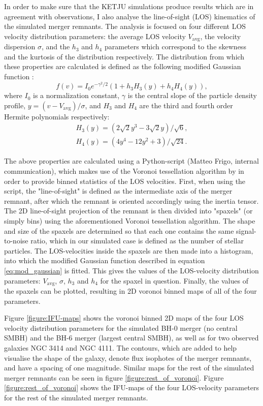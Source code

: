 \documentclass[english, oneside]{HYgradu}
\begin{document}
In order to make sure that the KETJU simulations produce results which are in agreement with observations, I  also analyse the line-of-sight (LOS) kinematics of the simulated merger remnants. The analysis is focused on four different LOS velocity distribution parameters: the average LOS velocity $V_\mathrm{avg}$, the velocity dispersion $\sigma$, and the $h_3$ and $h_4$ parameters which correspond to the skewness and the kurtosis of the distribution respectively. The distribution from which these properties are calculated is defined as the following modified Gaussian function \citep{VanDerMarel1993, Bender1994}:
\begin{equation}
f(v) = I_0 e^{-\gamma^2/2}(1 + h_3 H_3(y) + h_4 H_4(y)), \label{eq:mod_gaussian}
\end{equation} 
where $I_0$ is a normalization constant, $\gamma$ is the central slope of the particle density profile, $y = (v - V_\mathrm{avg})/\sigma$, and $H_3$ and $H_4$ are the third and fourth order Hermite polynomials respectively:
\begin{eqnarray}
H_3(y) = \left(2\sqrt{2}y^3 - 3\sqrt{2}y\right) / \sqrt{6}, \\
H_4(y) = \left(4y^4 - 12y^2 + 3 \right) / \sqrt{24}.
\end{eqnarray}

The above properties are calculated using a Python-script (Matteo Frigo, internal communication), which makes use of the Voronoi tessellation algorithm by \citep{Cappellari2003} in order to provide binned statistics of the LOS velocities. First, when using the script, the "line-of-sight" is defined as the intermediate axis of the merger remnant, after which the remnant is oriented accordingly using the inertia tensor. The 2D line-of-sight projection of the remnant is then divided into "spaxels" (or simply bins) using the aforementioned Voronoi tessellation algorithm. The shape and size of the spaxels are determined so that each one contains the same signal-to-noise ratio, which in our simulated case is defined as the number of stellar particles. The LOS-velocities inside the spaxels are then made into a histogram, into which the modified Gaussian function described in equation \ref{eq:mod_gaussian} is fitted. This gives the values of the LOS-velocity distribution parameters: $V_\mathrm{avg}$, $\sigma$, $h_3$ and $h_4$ for the spaxel in question. Finally, the values of the spaxels can be plotted, resulting in 2D voronoi binned maps of all of the four parameters.

Figure \ref{figure:IFU-maps} shows the voronoi binned 2D maps of the four LOS velocity distribution parameters for the simulated BH-0 merger (no central SMBH) and the BH-6 merger (largest central SMBH), as well as for two observed galaxies NGC 3414 and NGC 4111. The contours, which are added to help visualise the shape of the galaxy, denote flux isophotes of the merger remnants, and have a spacing of one magnitude. Similar maps for the rest of the simulated merger remnants can be seen in figure \ref{figure:rest_of_voronoi}. Figure \ref{figure:rest_of_voronoi} shows the IFU-maps of the four LOS-velocity parameters for the rest of the simulated merger remnants.
\end{document}

